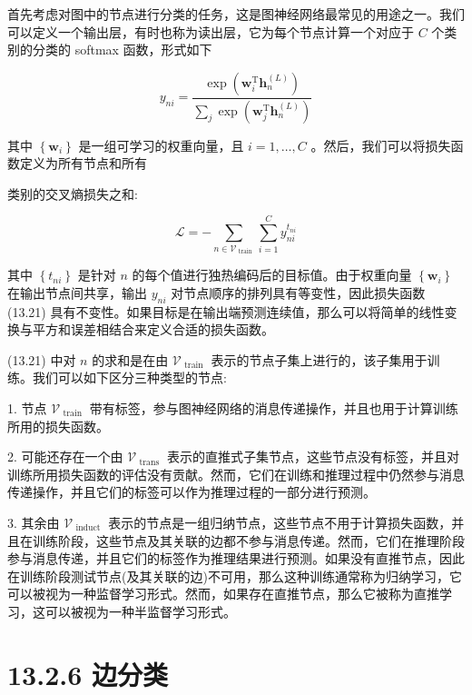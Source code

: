 \documentclass[10pt]{report}
\begin{document}
首先考虑对图中的节点进行分类的任务，这是图神经网络最常见的用途之一。我们可以定义一个输出层，有时也称为读出层，它为每个节点计算一个对应于 \(C\) 个类别的分类的 softmax 函数，形式如下

\[
{y}_{ni} = \frac{\exp \left( {{\mathbf{w}}_{i}^{\mathrm{T}}{\mathbf{h}}_{n}^{\left( L\right) }}\right) }{\mathop{\sum }\limits_{j}\exp \left( {{\mathbf{w}}_{j}^{\mathrm{T}}{\mathbf{h}}_{n}^{\left( L\right) }}\right) } \tag{13.20}
\]

其中 \(\left\{  {\mathbf{w}}_{i}\right\}\) 是一组可学习的权重向量，且 \(i = 1,\ldots ,C\) 。然后，我们可以将损失函数定义为所有节点和所有

类别的交叉熵损失之和:

\[
\mathcal{L} =  - \mathop{\sum }\limits_{{n \in  {\mathcal{V}}_{\text{ train }}}}\mathop{\sum }\limits_{{i = 1}}^{C}{y}_{ni}^{{t}_{ni}} \tag{13.21}
\]

其中 \(\left\{  {t}_{ni}\right\}\) 是针对 \(n\) 的每个值进行独热编码后的目标值。由于权重向量 \(\left\{  {\mathbf{w}}_{i}\right\}\) 在输出节点间共享，输出 \({y}_{ni}\) 对节点顺序的排列具有等变性，因此损失函数 (13.21) 具有不变性。如果目标是在输出端预测连续值，那么可以将简单的线性变换与平方和误差相结合来定义合适的损失函数。

(13.21) 中对 \(n\) 的求和是在由 \({\mathcal{V}}_{\text{ train }}\) 表示的节点子集上进行的，该子集用于训练。我们可以如下区分三种类型的节点:

1. 节点 \({\mathcal{V}}_{\text{ train }}\) 带有标签，参与图神经网络的消息传递操作，并且也用于计算训练所用的损失函数。

2. 可能还存在一个由 \({\mathcal{V}}_{\text{ trans }}\) 表示的直推式子集节点，这些节点没有标签，并且对训练所用损失函数的评估没有贡献。然而，它们在训练和推理过程中仍然参与消息传递操作，并且它们的标签可以作为推理过程的一部分进行预测。

3. 其余由 \({\mathcal{V}}_{\text{ induct }}\) 表示的节点是一组归纳节点，这些节点不用于计算损失函数，并且在训练阶段，这些节点及其关联的边都不参与消息传递。然而，它们在推理阶段参与消息传递，并且它们的标签作为推理结果进行预测。如果没有直推节点，因此在训练阶段测试节点(及其关联的边)不可用，那么这种训练通常称为归纳学习，它可以被视为一种监督学习形式。然而，如果存在直推节点，那么它被称为直推学习，这可以被视为一种半监督学习形式。

\section*{13.2.6 边分类}
\end{document}
